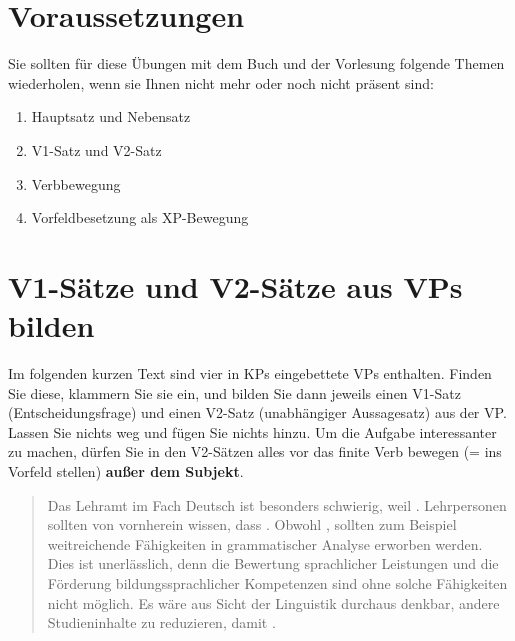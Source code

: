 \section*{Voraussetzungen}

Sie sollten für diese Übungen mit dem Buch und der Vorlesung folgende Themen wiederholen, wenn sie Ihnen nicht mehr oder noch nicht präsent sind:

\begin{enumerate}\Lf
  \item Hauptsatz und Nebensatz
  \item V1-Satz und V2-Satz
  \item Verbbewegung
  \item Vorfeldbesetzung als XP-Bewegung
\end{enumerate}

\Zeile

\section{V1-Sätze und V2-Sätze aus VPs bilden}\label{sec:bilden}

Im folgenden kurzen Text sind vier in KPs eingebettete VPs enthalten.
Finden Sie diese, klammern Sie sie ein, und bilden Sie dann jeweils einen V1-Satz (Entscheidungsfrage) und einen V2-Satz (unabhängiger Aussagesatz) aus der VP.
Lassen Sie nichts weg und fügen Sie nichts hinzu.
Um die Aufgabe interessanter zu machen, dürfen Sie in den V2-Sätzen alles vor das finite Verb bewegen (= ins Vorfeld stellen) \textbf{außer dem Subjekt}.

\begin{quote}
  Das Lehramt im Fach Deutsch ist besonders schwierig, weil .
  Lehrpersonen sollten von vornherein wissen, dass .
  Obwohl , sollten zum Beispiel weitreichende Fähigkeiten in grammatischer Analyse erworben werden.
  Dies ist unerlässlich, denn die Bewertung sprachlicher Leistungen und die Förderung bildungssprachlicher Kompetenzen sind ohne solche Fähigkeiten nicht möglich.
  Es wäre aus Sicht der Linguistik durchaus denkbar, andere Studieninhalte zu reduzieren, damit .
\end{quote}

\Halbzeile

